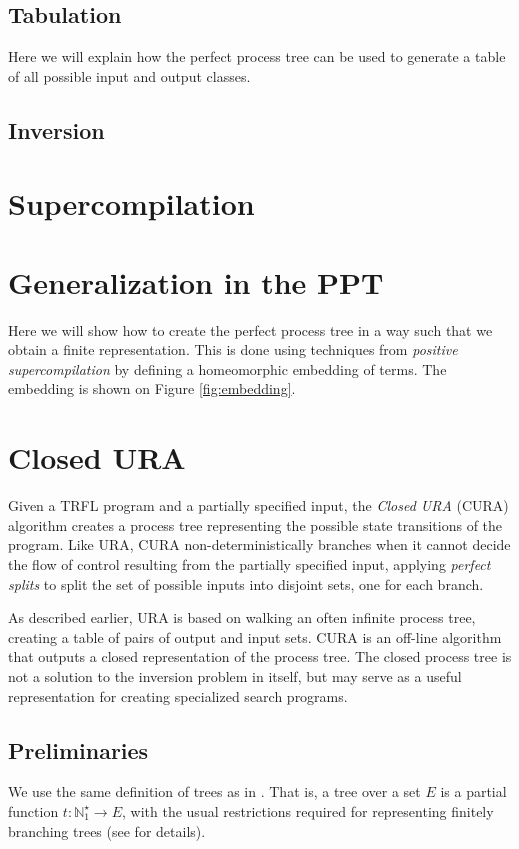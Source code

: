 \documentclass[10pt]{../sigplanconf}
\begin{document}
\subsection{Tabulation}
Here we will explain how the perfect process tree can be used to
generate a table of all possible input and output classes.

\subsection{Inversion}

\section{Supercompilation}

\section{Generalization in the PPT}
Here we will show how to create the perfect process tree in a way such
that we obtain a finite representation. This is done using techniques
from \textit{positive supercompilation} by defining a homeomorphic
embedding of terms. The embedding is shown on Figure
\ref{fig:embedding}.

\section{Closed URA}
Given a TRFL program and a partially specified input, the \emph{Closed
  URA} (CURA) algorithm creates a process tree representing the
possible state transitions of the program. Like URA, CURA
non-deterministically branches when it cannot decide the flow of
control resulting from the partially specified input, applying
\emph{perfect splits} to split the set of possible inputs into
disjoint sets, one for each branch.

As described earlier, URA is based on walking an often infinite
process tree, creating a table of pairs of output and input sets. CURA
is an off-line algorithm that outputs a closed representation of the
process tree. The closed process tree is not a solution to the
inversion problem in itself, but may serve as a useful representation
for creating specialized search programs.

\subsection{Preliminaries}
We use the same definition of trees as in
\cite{sorensen1998introduction}. That is, a tree over a set $E$ is a
partial function $t : \mathbb{N}_1^\star \rightarrow E$, with the
usual restrictions required for representing finitely branching trees
(see \cite{sorensen1998introduction}\cite{courcelle1983fundamental}
for details).
\end{document}

